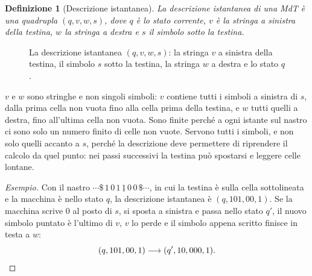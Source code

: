 \documentclass[a4paper, 11pt, oneside]{book}
\theoremstyle{formale}
\newtheorem*{definition}{Definizione}
\newenvironment{esempio}
    {\begin{proof}[\textit{Esempio}]\renewcommand{\qedsymbol}{$\diamond$}}
    {\end{proof}}
\begin{document}
    \begin{definition}[Descrizione istantanea]
        La \emph{descrizione istantanea} di una MdT \`e una quadrupla $(q, v, w, s)$,
        dove $q$ \`e lo stato corrente, $v$ \`e la stringa a sinistra della testina, $w$
        la stringa a destra e $s$ il simbolo sotto la testina.
    \end{definition}

    \begin{figure}[H]
        \centering
        \caption{La descrizione istantanea $(q, v, w, s)$: la stringa $v$ a sinistra
            della testina, il simbolo $s$ sotto la testina, la stringa $w$ a destra e lo
            stato $q$.}
        \label{fig:mdt-descrizione}
    \end{figure}

    $v$ e $w$ sono stringhe e non singoli simboli: $v$ contiene tutti i simboli a
    sinistra di $s$, dalla prima cella non vuota fino alla cella prima della testina, e
    $w$ tutti quelli a destra, fino all'ultima cella non vuota. Sono finite perch\'e a
    ogni istante sul nastro ci sono solo un numero finito di celle non vuote. Servono
    tutti i simboli, e non solo quelli accanto a $s$, perch\'e la descrizione deve
    permettere di riprendere il calcolo da quel punto: nei passi successivi la testina
    pu\`o spostarsi e leggere celle lontane.

    \begin{esempio}
        Con il nastro $\cdots \$\, 1\, 0\, 1\, \underline{1}\, 0\, 0\, \$ \cdots$, in cui la
        testina \`e sulla cella sottolineata e la macchina \`e nello stato $q$, la
        descrizione istantanea \`e $(q, 101, 00, 1)$. Se la macchina scrive $0$ al posto
        di $s$, si sposta a sinistra e passa nello stato $q'$, il nuovo simbolo puntato
        \`e l'ultimo di $v$, $v$ lo perde e il simbolo appena scritto finisce in testa a
        $w$:
        \begin{equation*}
            (q, 101, 00, 1) \longrightarrow (q', 10, 000, 1).\qedhere
        \end{equation*}
    \end{esempio}
\end{document}
